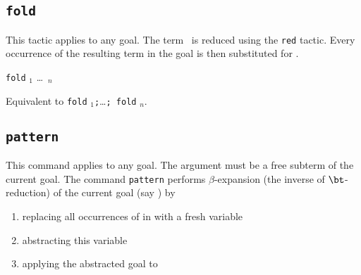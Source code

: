 
\subsection{{\tt fold} \term
{}}

This tactic applies to any goal. The term \term\ is reduced using the {\tt red}
tactic. Every occurrence of the resulting term in the goal is then
substituted for \term.

\begin{Variants}
\item {\tt fold} \term$_1$ \dots\ \term$_n$ 
  
  Equivalent to {\tt fold} \term$_1${\tt;}\ldots{\tt; fold} \term$_n$.
\end{Variants}

\subsection{{\tt pattern {\term}}
\label{pattern}}

This command applies to any goal. The argument {\term} must be a free
subterm of the current goal.  The command {\tt pattern} performs
$\beta$-expansion (the inverse of $\bt$-reduction) of the current goal
(say \T) by
\begin{enumerate}
\item replacing all occurrences of {\term} in {\T} with a fresh variable
\item abstracting this variable
\item applying the abstracted goal to {\term}
\end{enumerate}

